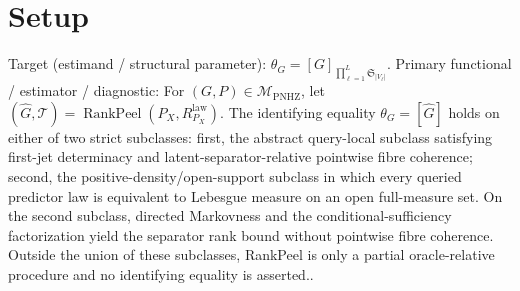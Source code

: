 \documentclass{article}
\begin{document}
\section{Setup}

Target (estimand / structural parameter): \(\theta_G=[G]_{\prod_{\ell=1}^{L}\mathfrak S_{|V_\ell|}}\).
Primary functional / estimator / diagnostic: For \( (G,P)\in\mathcal M_{\mathrm{PNHZ}} \), let \( (\widehat G,\mathcal T)=\operatorname{RankPeel}(P_X,R^{\mathrm{law}}_{P_X}) \).  The identifying equality \(\theta_G=[\widehat G]\) holds on either of two strict subclasses: first, the abstract query-local subclass satisfying first-jet determinacy and latent-separator-relative pointwise fibre coherence; second, the positive-density/open-support subclass in which every queried predictor law is equivalent to Lebesgue measure on an open full-measure set.  On the second subclass, directed Markovness and the conditional-sufficiency factorization yield the separator rank bound without pointwise fibre coherence.  Outside the union of these subclasses, RankPeel is only a partial oracle-relative procedure and no identifying equality is asserted..
\end{document}

